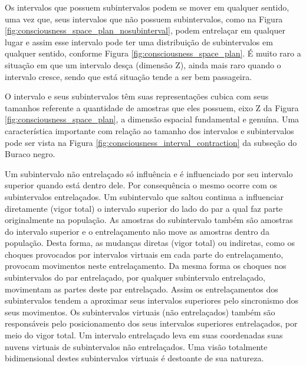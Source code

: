 Os intervalos que possuem subintervalos podem se mover em qualquer sentido, uma vez que, seus intervalos que não possuem subintervalos, como na Figura \ref{fig:consciousness_space_plan_nosubinterval}, podem entrelaçar em qualquer lugar e assim esse intervalo pode ter uma distribuição de subintervalos em qualquer sentido, conforme Figura \ref{fig:consciousness_space_plan}. É muito raro a situação em que um intervalo desça (dimensão Z), ainda mais raro quando o intervalo cresce, sendo que está situação tende a ser bem passageira.

O intervalo e seus subintervalos têm suas representações cubica com seus tamanhos referente a quantidade de amostras que eles possuem, eixo Z da Figura \ref{fig:consciousness_space_plan}, a dimensão espacial fundamental e genuína. Uma característica importante com relação ao tamanho dos intervalos e subintervalos pode ser vista na Figura \ref{fig:consciousness_interval_contraction} da subseção do Buraco negro.

Um subintervalo não entrelaçado só influência e é influenciado por seu intervalo superior quando está dentro dele. Por consequência o mesmo ocorre com os subintervalos entrelaçados. Um subintervalo que saltou continua a influenciar diretamente (vigor total) o intervalo superior do lado do par a qual faz parte originalmente na população. As amostras do subintervalo também são amostras do intervalo superior e o entrelaçamento não move as amostras dentro da população. Desta forma, as mudanças diretas (vigor total) ou indiretas, como os choques provocados por intervalos virtuais em cada parte do entrelaçamento, provocam movimentos neste entrelaçamento. Da mesma forma os choques nos subintervalos do par entrelaçado, por qualquer subintervalo entrelaçado, movimentam as partes deste par entrelaçado. Assim os entrelaçamentos dos subintervalos tendem a aproximar seus intervalos superiores pelo sincronismo dos seus movimentos. Os subintervalos virtuais (não entrelaçados) também são responsáveis pelo posicionamento dos seus intervalos superiores entrelaçados, por meio do vigor total. Um intervalo entrelaçado leva em suas coordenadas suas nuvens virtuais de subintervalos não entrelaçados. Uma visão totalmente bidimensional destes subintervalos virtuais é destoante de sua natureza.

